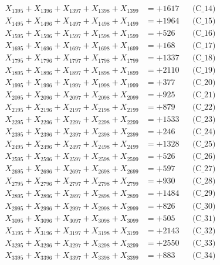 \documentclass[a4paper,10pt]{article}
\begin{document}
{\begin{align}
X_{1395} + X_{1396} + X_{1397} + X_{1398} + X_{1399} &= +1617 && \text{(C\_14)} \\
X_{1495} + X_{1496} + X_{1497} + X_{1498} + X_{1499} &= +1964 && \text{(C\_15)} \\
\allowbreak
X_{1595} + X_{1596} + X_{1597} + X_{1598} + X_{1599} &= +526 && \text{(C\_16)} \\
X_{1695} + X_{1696} + X_{1697} + X_{1698} + X_{1699} &= +168 && \text{(C\_17)} \\
X_{1795} + X_{1796} + X_{1797} + X_{1798} + X_{1799} &= +1337 && \text{(C\_18)} \\
X_{1895} + X_{1896} + X_{1897} + X_{1898} + X_{1899} &= +2110 && \text{(C\_19)} \\
X_{1995} + X_{1996} + X_{1997} + X_{1998} + X_{1999} &= +377 && \text{(C\_20)} \\
\allowbreak
X_{2095} + X_{2096} + X_{2097} + X_{2098} + X_{2099} &= +925 && \text{(C\_21)} \\
X_{2195} + X_{2196} + X_{2197} + X_{2198} + X_{2199} &= +879 && \text{(C\_22)} \\
X_{2295} + X_{2296} + X_{2297} + X_{2298} + X_{2299} &= +1533 && \text{(C\_23)} \\
X_{2395} + X_{2396} + X_{2397} + X_{2398} + X_{2399} &= +246 && \text{(C\_24)} \\
X_{2495} + X_{2496} + X_{2497} + X_{2498} + X_{2499} &= +1328 && \text{(C\_25)} \\
\allowbreak
X_{2595} + X_{2596} + X_{2597} + X_{2598} + X_{2599} &= +526 && \text{(C\_26)} \\
X_{2695} + X_{2696} + X_{2697} + X_{2698} + X_{2699} &= +597 && \text{(C\_27)} \\
X_{2795} + X_{2796} + X_{2797} + X_{2798} + X_{2799} &= +930 && \text{(C\_28)} \\
X_{2895} + X_{2896} + X_{2897} + X_{2898} + X_{2899} &= +1484 && \text{(C\_29)} \\
X_{2995} + X_{2996} + X_{2997} + X_{2998} + X_{2999} &= +826 && \text{(C\_30)} \\
\allowbreak
X_{3095} + X_{3096} + X_{3097} + X_{3098} + X_{3099} &= +505 && \text{(C\_31)} \\
X_{3195} + X_{3196} + X_{3197} + X_{3198} + X_{3199} &= +2143 && \text{(C\_32)} \\
X_{3295} + X_{3296} + X_{3297} + X_{3298} + X_{3299} &= +2550 && \text{(C\_33)} \\
X_{3395} + X_{3396} + X_{3397} + X_{3398} + X_{3399} &= +883 && \text{(C\_34)} \\

\end{align}}
\end{document}
